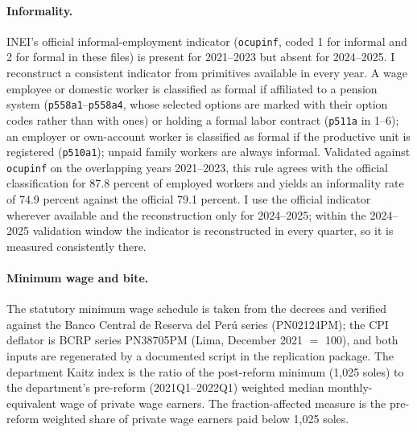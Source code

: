\paragraph{Informality.} INEI's official informal-employment indicator (\texttt{ocupinf}, coded 1 for informal and 2 for formal in these files) is present for 2021--2023 but absent for 2024--2025. I reconstruct a consistent indicator from primitives available in every year. A wage employee or domestic worker is classified as formal if affiliated to a pension system (\texttt{p558a1}--\texttt{p558a4}, whose selected options are marked with their option codes rather than with ones) or holding a formal labor contract (\texttt{p511a} in 1--6); an employer or own-account worker is classified as formal if the productive unit is registered (\texttt{p510a1}); unpaid family workers are always informal. Validated against \texttt{ocupinf} on the overlapping years 2021--2023, this rule agrees with the official classification for 87.8 percent of employed workers and yields an informality rate of 74.9 percent against the official 79.1 percent. I use the official indicator wherever available and the reconstruction only for 2024--2025; within the 2024--2025 validation window the indicator is reconstructed in every quarter, so it is measured consistently there.

\paragraph{Minimum wage and bite.} The statutory minimum wage schedule is taken from the decrees and verified against the Banco Central de Reserva del Perú series (PN02124PM); the CPI deflator is BCRP series PN38705PM (Lima, December 2021 $=$ 100), and both inputs are regenerated by a documented script in the replication package. The department Kaitz index is the ratio of the post-reform minimum (1,025 soles) to the department's pre-reform (2021Q1--2022Q1) weighted median monthly-equivalent wage of private wage earners. The fraction-affected measure is the pre-reform weighted share of private wage earners paid below 1,025 soles.

